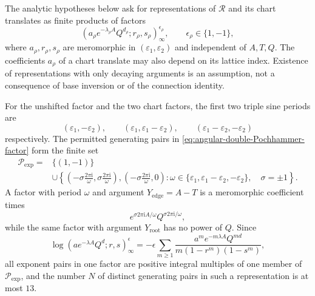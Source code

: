 \documentclass{amsart}
\theoremstyle{definition}
\numberwithin{equation}{section}
\newcommand{\eps}{\varepsilon}
\begin{document}
The analytic hypotheses below ask for representations of \(\mathcal R\) and its chart translates as finite products of factors
\begin{equation}
 \left(a_\rho e^{-\lambda_\rho A}Q^{d_\rho};
       r_\rho,s_\rho\right)_\infty^{\epsilon_\rho},
 \qquad \epsilon_\rho\in\{1,-1\},
\label{eq:angular-double-Pochhammer-factor}
\end{equation}
where \(a_\rho,r_\rho,s_\rho\) are meromorphic in \((\eps_1,\eps_2)\) and independent of \(A,T,Q\).  The coefficients \(a_\rho\) of a chart translate may also depend on its lattice index.  Existence of representations with only decaying arguments is an assumption, not a consequence of base inversion or of the connection identity.

For the unshifted factor and the two chart factors, the first two triple sine periods are
\[
 (\eps_1,-\eps_2),\qquad
 (\eps_1,\eps_1-\eps_2),\qquad
 (\eps_1-\eps_2,-\eps_2)
\]
respectively.  The permitted generating pairs in \eqref{eq:angular-double-Pochhammer-factor} form the finite set
\begin{equation}
 \begin{aligned}
 \mathcal P_{\mathrm{exp}}={}&\{(1,-1)\}\\
 &\cup\left\{
 \left(-\sigma\frac{2\pi\mathrm{i}}{\omega},
        \sigma\frac{2\pi\mathrm{i}}{\omega}\right),
 \left(-\sigma\frac{2\pi\mathrm{i}}{\omega},0\right):
 \omega\in\{\eps_1,\eps_1-\eps_2,-\eps_2\},\quad
 \sigma=\pm1\right\}.
 \end{aligned}
\label{eq:finite-exponent-pairs}
\end{equation}
A factor with period \(\omega\) and argument \(Y_{\mathrm{edge}}=A-T\) is a meromorphic coefficient times
\[
 e^{\sigma 2\pi\mathrm{i}A/\omega}
 Q^{\sigma 2\pi\mathrm{i}/\omega},
\]
while the same factor with argument \(Y_{\mathrm{root}}\) has no power of \(Q\).  Since
\begin{equation}
 \log\left(ae^{-\lambda A}Q^d;r,s\right)_\infty^\epsilon
 =-\epsilon\sum_{m\geq1}
 \frac{a^m e^{-m\lambda A}Q^{md}}
 {m(1-r^m)(1-s^m)},
\label{eq:double-Pochhammer-log-expansion}
\end{equation}
all exponent pairs in one factor are positive integral multiples of one member of \(\mathcal P_{\mathrm{exp}}\), and the number \(N\) of distinct generating pairs in such a representation is at most \(13\).
\end{document}
